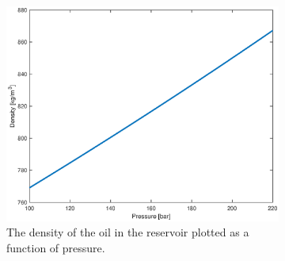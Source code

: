 \begin{figure}[H]
\begin{subfigure}[t]{0.48\textwidth}
    \end{subfigure}
    \begin{subfigure}[t]{0.48\textwidth}
        \includegraphics[width=\textwidth]{figures/flow_solver_density.eps}
        \caption{The density of the oil in the reservoir plotted as a function of pressure.}
        \label{fig:flowSolverDensity}
    \end{subfigure}
    \caption{}
\end{figure}

